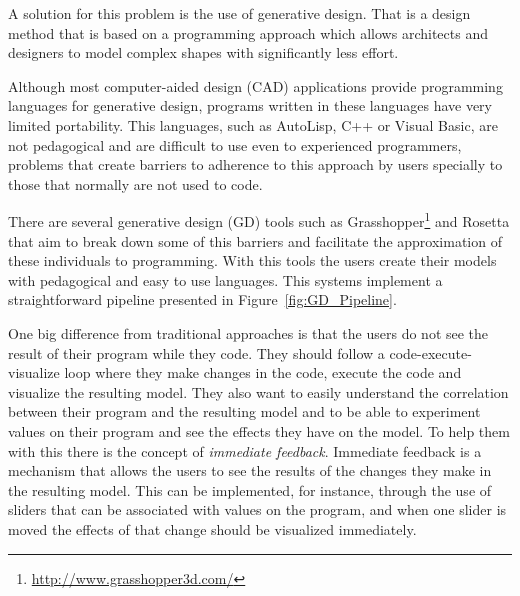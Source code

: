A solution for this problem is the use of generative design. That is a design method that is based on a programming approach which allows architects and designers to model complex shapes with significantly less effort. 

Although most computer-aided design (CAD) applications provide programming languages for generative design, programs written in these languages have very limited portability. This languages, such as AutoLisp, C++ or Visual Basic, are not pedagogical and are difficult to use even to experienced programmers, problems that create barriers to adherence to this approach by users specially to those that normally are not used to code.\cite{ramos_et_al:OASIcs:2014:4565}

There are several generative design (GD) tools such as Grasshopper\footnote{\url{http://www.grasshopper3d.com/}} and Rosetta\cite{Leit2012} that aim to break down some of this barriers and facilitate the approximation of these individuals to programming. With this tools the users create their models with pedagogical and easy to use languages. This systems implement a straightforward pipeline presented in Figure~\ref{fig:GD_Pipeline}. 

One big difference from traditional approaches is that the users do not see the result of their program while they code. They should follow a code-execute-visualize loop where they make changes in the code, execute the code and visualize the resulting model. They also want to easily understand the correlation between their program and the resulting model and to be able to experiment values on their program and see the effects they have on the model. To help them with this there is the concept of \emph{immediate feedback}. Immediate feedback is a mechanism that allows the users to see the results of the changes they make in the resulting model. This can be implemented, for instance, through the use of sliders that can be associated with values on the program, and when one slider is moved the effects of that change should be visualized immediately. 


